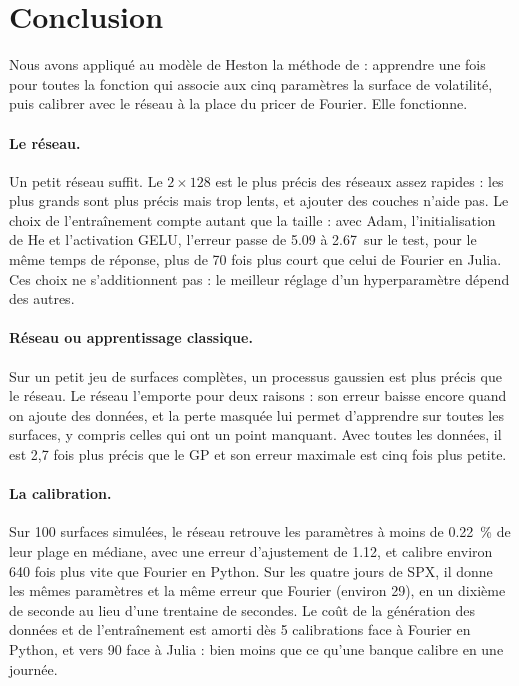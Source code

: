 
\section{Conclusion}
\label{sec-conclusion}

Nous avons appliqué au modèle de Heston la méthode de \citet{horvath2021} : apprendre une fois pour toutes la
fonction qui associe aux cinq paramètres la surface de volatilité, puis calibrer avec le réseau à la place du
pricer de Fourier. Elle fonctionne.

\paragraph{Le réseau.} Un petit réseau suffit. Le $2\times128$ est le plus précis des réseaux assez rapides : les
plus grands sont plus précis mais trop lents, et ajouter des couches n'aide pas. Le choix de l'entraînement compte
autant que la taille : avec Adam, l'initialisation de He et l'activation GELU, l'erreur passe de \num{5.09} à
\num{2.67}\pb\ sur le test, pour le même temps de réponse, plus de 70 fois plus court que celui de
Fourier en Julia. Ces choix ne s'additionnent pas : le meilleur réglage d'un hyperparamètre dépend des autres.

\paragraph{Réseau ou apprentissage classique.} Sur un petit jeu de surfaces complètes, un processus gaussien est
plus précis que le réseau. Le réseau l'emporte pour deux raisons : son erreur baisse encore quand on ajoute des
données, et la perte masquée lui permet d'apprendre sur toutes les surfaces, y compris celles qui ont un point
manquant. Avec toutes les données, il est 2,7 fois plus précis que le GP et son erreur maximale est cinq fois plus
petite.

\paragraph{La calibration.} Sur 100 surfaces simulées, le réseau retrouve les paramètres à moins de
\SI{0.22}{\percent} de leur plage en médiane, avec une erreur d'ajustement de \num{1.12}\pb, et calibre environ
640 fois plus vite que Fourier en Python. Sur les quatre jours de SPX, il donne les mêmes paramètres et la même
erreur que Fourier (environ \num{29}\pb), en un dixième de seconde au lieu d'une trentaine de secondes. Le coût de la
génération des données et de l'entraînement est amorti dès 5 calibrations face à Fourier en Python, et vers
\num{90} face à Julia : bien moins que ce qu'une banque calibre en une journée.

